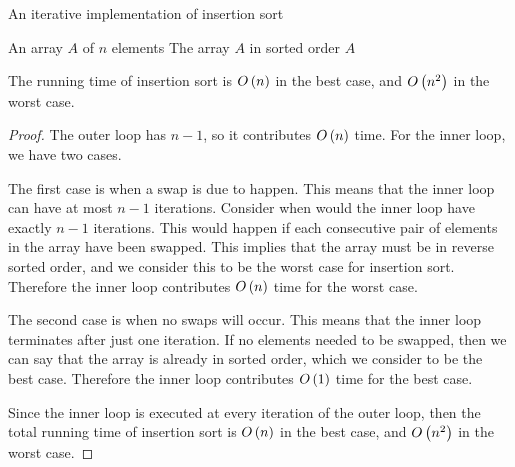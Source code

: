 \begin{algorithm}[H]
    \caption{An iterative implementation of insertion sort}
    \begin{algorithmic}[1]
        \Require An array $A$ of $n$ elements
        \Ensure The array $A$ in sorted order
        \Statex
                    \State {}
                \Else
                    \Break
                \EndIf
            \EndFor
        \EndFor
        \Return $A$
    \EndFunction
    \end{algorithmic}
\end{algorithm}

\begin{claim}
    The running time of insertion sort is $O\left(n \right)$ in the best case, and $O\left(n^2 \right)$ in the worst case.
\end{claim}
\begin{proof}
    The outer loop has $n-1$, so it contributes $O\left(n \right)$ time. For the inner loop, we have two cases.

    The first case is when a swap is due to happen. This means that the inner loop can have at most $n-1$ iterations. Consider when would the inner loop have exactly $n-1$ iterations. This would happen if each consecutive pair of elements in the array have been swapped. This implies that the array must be in reverse sorted order, and we consider this to be the worst case for insertion sort. Therefore the inner loop contributes $O\left(n \right)$ time for the worst case.

    The second case is when no swaps will occur. This means that the inner loop terminates after just one iteration. If no elements needed to be swapped, then we can say that the array is already in sorted order, which we consider to be the best case. Therefore the inner loop contributes $O\left(1 \right)$ time for the best case.

    Since the inner loop is executed at every iteration of the outer loop, then the total running time of insertion sort is $O\left(n \right)$ in the best case, and $O\left(n^2 \right)$ in the worst case.
\end{proof}

